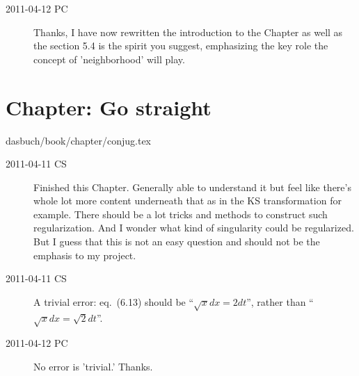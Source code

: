 \begin{description}
\item[2011-04-12 PC] Thanks, I have now rewritten the introduction to the
Chapter as well as the section 5.4 is the spirit you suggest, emphasizing
the key role the concept of 'neighborhood' will play.

\end{description}

\section{Chapter: Go straight}
\label{c-conjug}\noindent dasbuch/book/chapter/conjug.tex
\begin{description}

\item[2011-04-11 CS]
Finished this Chapter. Generally able to understand it but feel like
there's whole lot more content underneath that as in the KS
transformation for example. There should be a lot tricks and methods to
construct such regularization. And I wonder what kind of singularity
could be regularized. But I guess that this is not an easy question and
should not be the emphasis to my project.


\item[2011-04-11 CS]
A trivial error: eq.~(6.13) should be ``$\sqrt{x}dx = 2dt$'',
rather than ``$\sqrt{x}dx = \sqrt{2}dt$''.

\item[2011-04-12 PC]
No error is 'trivial.' Thanks.

\end{description}


